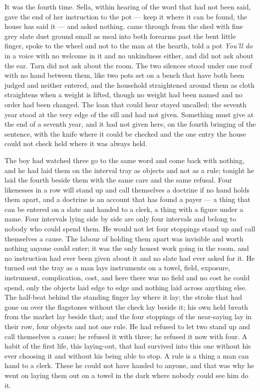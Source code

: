 It was the fourth time. Sella, within hearing of the word that had not been said, gave the end of her instruction to the pot --- keep it where it can be found, the house has said it --- and asked nothing.  came through from the shed with fine grey slate dust ground small as meal into both forearms past the bent little finger, spoke to the wheel and not to the man at the hearth, told a pot \emph{You'll do} in a voice with no welcome in it and no unkindness either, and did not ask about the ear. Tarn did not ask about the room. The two silences stood under one roof with no hand between them, like two pots set on a bench that have both been judged and neither entered, and the household straightened around them as cloth straightens when a weight is lifted, though no weight had been named and no order had been changed. The loan that could hear stayed uncalled; the seventh year stood at the very edge of the sill and had not given. Something must give at the end of a seventh year, and it had not given here, on the fourth bringing of the sentence, with the knife where it could be checked and the one entry the house could not check held where it was always held.

The boy had watched three go to the same word and come back with nothing, and he had laid them on the interval tray as objects and not as a rule; tonight he laid the fourth beside them with the same care and the same refusal. Four likenesses in a row will stand up and call themselves a doctrine if no hand holds them apart, and a doctrine is an account that has found a payer --- a thing that can be entered on a slate and handed to a clerk, a thing with a figure under a name. Four intervals lying side by side are only four intervals and belong to nobody who could spend them. He would not let four stoppings stand up and call themselves a cause. The labour of holding them apart was invisible and worth nothing anyone could enter; it was the only honest work going in the room, and no instruction had ever been given about it and no slate had ever asked for it. He turned out the tray as a man lays instruments on a towel, field, exposure, instrument, complication, cost, and here there was no field and no cost he could spend, only the objects laid edge to edge and nothing laid across anything else. The half-beat behind the standing finger lay where it lay; the stroke that had gone on over the flagstones without the check lay beside it; his own held breath from the market lay beside that; and the four stoppings of the near-saying lay in their row, four objects and not one rule. He had refused to let two stand up and call themselves a cause; he refused it with three; he refused it now with four. A habit of the first life, this laying-out, that had survived into this one without his ever choosing it and without his being able to stop. A rule is a thing a man can hand to a clerk. These he could not have handed to anyone, and that was why he went on laying them out on a towel in the dark where nobody could see him do it.

